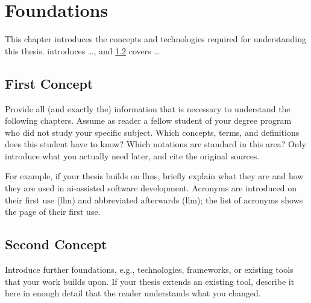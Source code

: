\chapter{Foundations}\label{chap:foundations}

This chapter introduces the concepts and technologies required for understanding this thesis.
 introduces \ldots, and \cref{sec:foundations:second} covers \ldots


\section{First Concept}\label{sec:foundations:first}

Provide all (and exactly the) information that is necessary to understand the following chapters.
Assume as reader a fellow student of your degree program who did not study your specific subject.
Which concepts, terms, and definitions does this student have to know?
Which notations are standard in this area?
Only introduce what you actually need later, and cite the original sources.

For example, if your thesis builds on \glspl{llm}, briefly explain what they are and how they are used in \gls{ai}-assisted software development.
Acronyms are introduced on their first use (\gls{llm}) and abbreviated afterwards (\gls{llm}); the list of acronyms shows the page of their first use.

\section{Second Concept}\label{sec:foundations:second}

Introduce further foundations, e.g., technologies, frameworks, or existing tools that your work builds upon.
If your thesis extends an existing tool, describe it here in enough detail that the reader understands what you changed.
